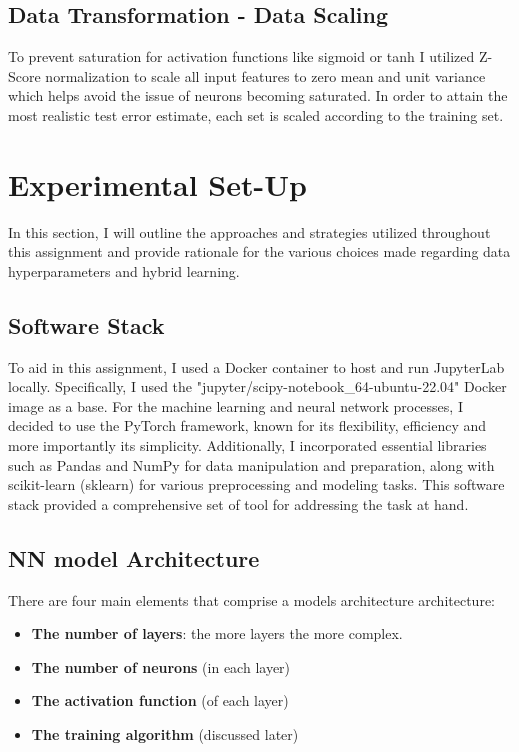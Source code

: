 \documentclass[conference]{IEEEtran}
\begin{document}
\subsection{Data Transformation - Data Scaling}
To prevent saturation for activation functions like sigmoid or tanh I utilized Z-Score normalization to scale all input features to zero mean and unit variance which helps avoid the issue of neurons becoming saturated. In order to attain the most realistic test error estimate, each set is scaled according to the training set.

\section{Experimental Set-Up}
In this section, I will outline the approaches and strategies utilized throughout this assignment and provide rationale for the various choices made regarding data hyperparameters and hybrid learning.

\subsection{Software Stack}
To aid in this assignment, I used a Docker container to host and run JupyterLab locally. Specifically, I used the "jupyter/scipy-notebook\_64-ubuntu-22.04" Docker image as a base. For the machine learning and neural network processes, I decided to use the PyTorch framework, known for its flexibility, efficiency and more importantly its simplicity. Additionally, I incorporated essential libraries such as Pandas and NumPy for data manipulation and preparation, along with scikit-learn (sklearn) for various preprocessing and modeling tasks. This software stack provided a comprehensive set of tool for addressing the task at hand.

\subsection{NN model Architecture}
There are four main elements that comprise a models architecture architecture:
\begin{itemize}
\item \textbf{The number of layers}: the more layers the more complex.
\item \textbf{The number of neurons} (in each layer)
\item \textbf{The activation function} (of each layer)
\item \textbf{The training algorithm} (discussed later)
\end{itemize}
\end{document}
